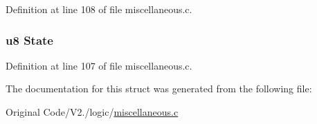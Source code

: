 \-Definition at line 108 of file miscellaneous.\-c.

\hypertarget{structnumstore_a35c66c877f571457e71e669b0c64d5b0}{
\subsubsection[{\-State}]{\setlength{\rightskip}{0pt plus 5cm}u8 {\bf \-State}}}\label{structnumstore_a35c66c877f571457e71e669b0c64d5b0}


\-Definition at line 107 of file miscellaneous.\-c.



\-The documentation for this struct was generated from the following file\-:\begin{DoxyCompactItemize}
\item 
\-Original Code/\-V2./logic/\hyperlink{miscellaneous_8c}{miscellaneous.\-c}\end{DoxyCompactItemize}
